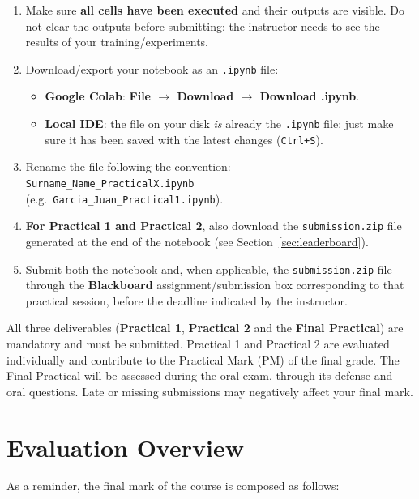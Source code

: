 \documentclass[11pt,a4paper]{article}
\begin{document}
\begin{enumerate}
    \item Make sure \textbf{all cells have been executed} and their outputs are visible. Do not clear the outputs before submitting: the instructor needs to see the results of your training/experiments.
    \item Download/export your notebook as an \texttt{.ipynb} file:
    \begin{itemize}
        \item \textbf{Google Colab}: \textbf{File $\rightarrow$ Download $\rightarrow$ Download .ipynb}.
        \item \textbf{Local IDE}: the file on your disk \textit{is} already the \texttt{.ipynb} file; just make sure it has been saved with the latest changes (\texttt{Ctrl+S}).
    \end{itemize}
    \item Rename the file following the convention: \\ \texttt{Surname\_Name\_PracticalX.ipynb} \\ (e.g.\ \texttt{Garcia\_Juan\_Practical1.ipynb}).
    \item \textbf{For Practical 1 and Practical 2}, also download the \texttt{submission.zip} file generated at the end of the notebook (see Section~\ref{sec:leaderboard}).
    \item Submit both the notebook and, when applicable, the \texttt{submission.zip} file through the \textbf{Blackboard} assignment/submission box corresponding to that practical session, before the deadline indicated by the instructor.
\end{enumerate}

\begin{warnbox}[Important]
All three deliverables (\textbf{Practical 1}, \textbf{Practical 2} and the \textbf{Final Practical}) are mandatory and must be submitted. Practical 1 and Practical 2 are evaluated individually and contribute to the Practical Mark (PM) of the final grade. The Final Practical will be assessed during the oral exam, through its defense and oral questions. Late or missing submissions may negatively affect your final mark.
\end{warnbox}

\section{Evaluation Overview}

As a reminder, the final mark of the course is composed as follows:
\end{document}
